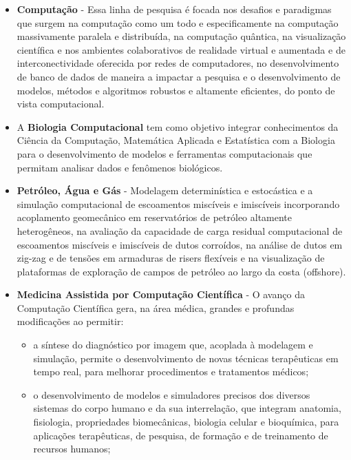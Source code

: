 \begin{itemize}
	\item \textbf{Computação} - Essa linha de pesquisa é focada nos desafios e
		paradigmas que surgem na computação como um todo e especificamente na
		computação massivamente paralela e distribuída, na computação quântica,
		na visualização científica e nos ambientes colaborativos de realidade
		virtual e aumentada e de interconectividade oferecida por redes de
		computadores, no desenvolvimento de banco de dados de maneira a impactar
		a pesquisa e o desenvolvimento de modelos, métodos e algoritmos robustos
		e altamente eficientes, do ponto de vista computacional.

	\item A \textbf{Biologia Computacional} tem como objetivo integrar
		conhecimentos da Ciência da Computação, Matemática Aplicada e
		Estatística com a Biologia para o desenvolvimento de modelos e
		ferramentas computacionais que permitam analisar dados e fenômenos
		biológicos. 

	\item \textbf{Petróleo, Água e Gás} - Modelagem determinística e estocástica
		e a simulação computacional de escoamentos miscíveis e imiscíveis
		incorporando acoplamento geomecânico em reservatórios de petróleo
		altamente heterogêneos, na avaliação da capacidade de carga residual
		computacional de escoamentos miscíveis e imiscíveis de dutos corroídos,
		na análise de dutos em zig-zag e de tensões em armaduras de risers
		flexíveis e na visualização de plataformas de exploração de campos de
		petróleo ao largo da costa (offshore).

	\item \textbf{Medicina Assistida por Computação Científica} - O avanço da
		Computação Científica gera, na área médica, grandes e profundas
		modificações ao permitir:
		\begin{itemize}

			\item a síntese do diagnóstico por imagem que, acoplada à modelagem
				e simulação, permite o desenvolvimento de novas técnicas
				terapêuticas em tempo real, para melhorar procedimentos e
				tratamentos médicos;

			\item o desenvolvimento de modelos e simuladores precisos dos
				diversos sistemas do corpo humano e da sua interrelação, que
				integram anatomia, fisiologia, propriedades biomecânicas,
				biologia celular e bioquímica, para aplicações terapêuticas, de
				pesquisa, de formação e de treinamento de recursos humanos;


\end{itemize}
\end{itemize}
